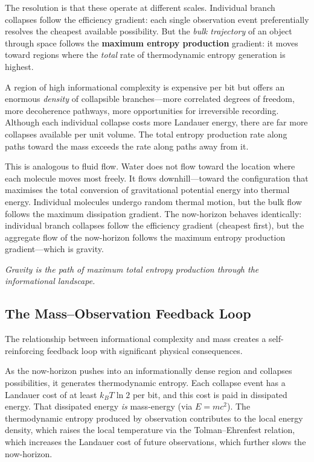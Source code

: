 \documentclass[12pt,a4paper]{article}
\begin{document}
The resolution is that these operate at different scales. Individual branch collapses follow the efficiency gradient: each single observation event preferentially resolves the cheapest available possibility. But the \emph{bulk trajectory} of an object through space follows the \textbf{maximum entropy production} gradient: it moves toward regions where the \emph{total} rate of thermodynamic entropy generation is highest.

A region of high informational complexity is expensive per bit but offers an enormous \emph{density} of collapsible branches---more correlated degrees of freedom, more decoherence pathways, more opportunities for irreversible recording. Although each individual collapse costs more Landauer energy, there are far more collapses available per unit volume. The total entropy production rate along paths toward the mass exceeds the rate along paths away from it.

This is analogous to fluid flow. Water does not flow toward the location where each molecule moves most freely. It flows downhill---toward the configuration that maximises the total conversion of gravitational potential energy into thermal energy. Individual molecules undergo random thermal motion, but the bulk flow follows the maximum dissipation gradient. The now-horizon behaves identically: individual branch collapses follow the efficiency gradient (cheapest first), but the aggregate flow of the now-horizon follows the maximum entropy production gradient---which is gravity.

\emph{Gravity is the path of maximum total entropy production through the informational landscape.}

\subsection{The Mass--Observation Feedback Loop}
\label{sec:feedback}

The relationship between informational complexity and mass creates a self-reinforcing feedback loop with significant physical consequences.

As the now-horizon pushes into an informationally dense region and collapses possibilities, it generates thermodynamic entropy. Each collapse event has a Landauer cost of at least $k_B T \ln 2$ per bit, and this cost is paid in dissipated energy. That dissipated energy \emph{is} mass-energy (via $E = mc^2$). The thermodynamic entropy produced by observation contributes to the local energy density, which raises the local temperature via the Tolman--Ehrenfest relation, which increases the Landauer cost of future observations, which further slows the now-horizon.
\end{document}
